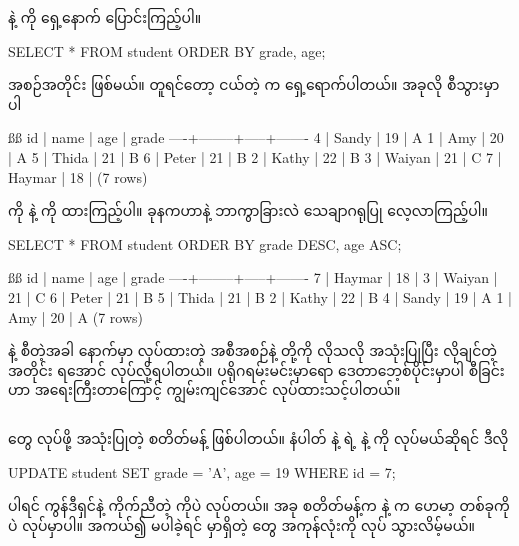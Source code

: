  နဲ့  ကို ရှေ့‌နောက် ပြောင်းကြည့်ပါ။ 
%
\begin{sql}
SELECT * FROM student ORDER BY grade, age;
\end{sql}
%
  အစဉ်အတိုင်း ဖြစ်မယ်။  တူရင်တော့  ငယ်တဲ့  က ရှေ့ရောက်ပါတယ်။ အခုလို စီသွားမှာပါ
%
\begin{vbtm}
ßß
 id |  name  | age | grade
----+--------+-----+-------
  4 | Sandy  |  19 | A
  1 | Amy    |  20 | A
  5 | Thida  |  21 | B
  6 | Peter  |  21 | B
  2 | Kathy  |  22 | B
  3 | Waiyan |  21 | C
  7 | Haymar |  18 |
(7 rows)
\end{vbtm}
%

 ကို  နဲ့  ကို  ထားကြည့်ပါ။ ခုနကဟာနဲ့ ဘာကွာခြားလဲ သေချာဂရုပြု လေ့လာကြည့်ပါ။
%
\begin{sql}
SELECT * FROM student ORDER BY grade DESC, age ASC;
\end{sql}
%
\begin{vbtm}
ßß
 id |  name  | age | grade
----+--------+-----+-------
  7 | Haymar |  18 |
  3 | Waiyan |  21 | C
  6 | Peter  |  21 | B
  5 | Thida  |  21 | B
  2 | Kathy  |  22 | B
  4 | Sandy  |  19 | A
  1 | Amy    |  20 | A
(7 rows)
\end{vbtm}

 နဲ့ စီတဲ့အခါ  နောက်မှာ  လုပ်ထားတဲ့  အစီအစဉ်နဲ့ \fEn{,}  တို့ကို လိုသလို အသုံးပြုပြီး လိုချင်တဲ့အတိုင်း ရအောင်  လုပ်လို့ရပါတယ်။ ပရိုဂရမ်းမင်းမှာရော ဒေတာဘေ့စ်ပိုင်းမှာပါ  စီခြင်းဟာ အရေးကြီးတာကြောင့် ကျွမ်းကျင်အောင် လုပ်ထားသင့်ပါတယ်။


\subsection*{}
 တွေ  လုပ်ဖို့ အသုံးပြုတဲ့  စတိတ်မန့် ဖြစ်ပါတယ်။  နံပါတ်  နဲ့  ရဲ့  နဲ့  ကို  လုပ်မယ်ဆိုရင် ဒီလို
%
\begin{sql}
UPDATE student SET grade = 'A', age = 19 WHERE id = 7;
\end{sql}
%
 ပါရင်  ကွန်ဒီရှင်နဲ့ ကိုက်ညီတဲ့  ကိုပဲ  လုပ်တယ်။ အခု  စတိတ်မန့်က   နဲ့ က ဟေမာ့  တစ်ခုကိုပဲ  လုပ်မှာပါ။ အကယ်၍  မပါခဲ့ရင်  မှာရှိတဲ့  တွေ အကုန်လုံးကို  လုပ် သွားလိမ့်မယ်။

